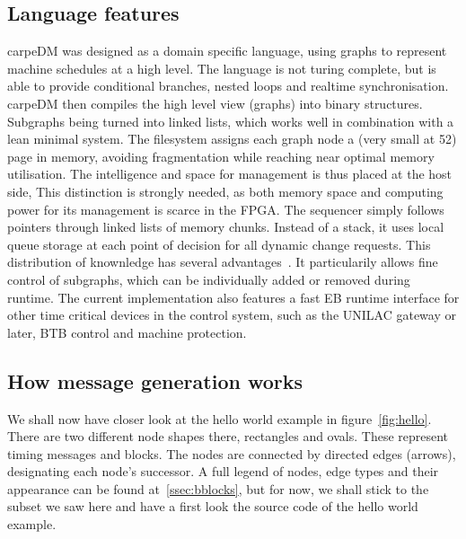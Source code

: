 \subsection{Language features}
carpeDM was designed as a domain specific language, using graphs to represent machine schedules at a high level. The language is not turing complete, but is able to provide conditional branches, nested loops and realtime synchronisation.
carpeDM then compiles the high level view (graphs) into binary structures. Subgraphs being turned into linked lists, which works well in combination with a lean minimal system.
The filesystem assigns each graph node a (very small at \SI{52}{\byte}) page in memory, avoiding fragmentation while reaching near optimal memory utilisation.
The intelligence and space for management is thus placed at the host side, This distinction is strongly needed, as both memory space and computing power for its management is scarce in the FPGA.
The sequencer simply follows pointers through linked lists of memory chunks. Instead of a stack, it uses local queue storage at each point of decision for all dynamic change requests.
This distribution of knownledge has several advantages~\cite[]{}. It particularily allows fine control of subgraphs, which can be individually added or removed during runtime.
The current implementation also features a fast EB runtime interface for other time critical devices in the control system, such as the UNILAC gateway or later, BTB control and machine protection.


\subsection{How message generation works}

We shall now have closer look at the hello world example in figure~\ref{fig:hello}. There are two different node shapes there, rectangles and ovals. These represent timing messages and blocks. The nodes are connected by directed edges (arrows), designating each node's successor. A full legend of nodes, edge types and their appearance can be found at~\ref{ssec:bblocks}, but for now, we shall stick to the subset we saw here and have a first look the source code of the hello world example.
%


